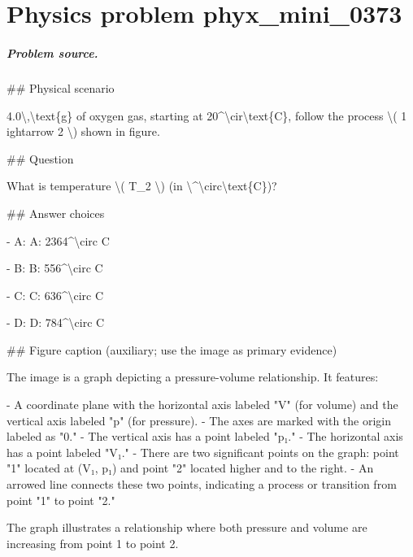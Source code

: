 
\chapter{Physics problem phyx\_mini\_0373}
\label{ch:PhyXMiniProblems_problem_phyx_mini_0373}

\paragraph{Problem source.}
\#\# Physical scenario

4.0\textbackslash{},\textbackslash{}text\{g\} of oxygen gas, starting at 20\textasciicircum{}\textbackslash{}cir\textbackslash{}text\{C\}, follow the process \textbackslash{}( 1 
ightarrow 2 \textbackslash{}) shown in figure.

\#\# Question

What is temperature \textbackslash{}( T\_2 \textbackslash{}) (in \textbackslash{}\textasciicircum{}\textbackslash{}circ\textbackslash{}text\{C\})?

\#\# Answer choices

- A: A: 2364\textasciicircum{}\textbackslash{}circ C

- B: B: 556\textasciicircum{}\textbackslash{}circ C

- C: C: 636\textasciicircum{}\textbackslash{}circ C

- D: D: 784\textasciicircum{}\textbackslash{}circ C

\#\# Figure caption (auxiliary; use the image as primary evidence)

The image is a graph depicting a pressure-volume relationship. It features:

- A coordinate plane with the horizontal axis labeled "V" (for volume) and the vertical axis labeled "p" (for pressure).
- The axes are marked with the origin labeled as "0."
- The vertical axis has a point labeled "p₁."
- The horizontal axis has a point labeled "V₁."
- There are two significant points on the graph: point "1" located at (V₁, p₁) and point "2" located higher and to the right.
- An arrowed line connects these two points, indicating a process or transition from point "1" to point "2." 

The graph illustrates a relationship where both pressure and volume are increasing from point 1 to point 2.


